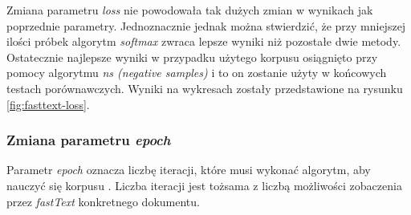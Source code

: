 Zmiana parametru \textit{loss} nie powodowała tak dużych zmian w wynikach jak poprzednie parametry. Jednoznacznie jednak można stwierdzić, że przy mniejszej ilości próbek algorytm \textit{softmax} zwraca lepsze wyniki niż pozostałe dwie metody. Ostatecznie najlepsze wyniki w przypadku użytego korpusu osiągnięto przy pomocy algorytmu \textit{ns (negative samples)} i to on zostanie użyty w końcowych testach porównawczych. Wyniki na wykresach zostały przedstawione na rysunku \ref{fig:fasttext-loss}.

\newpage
\subsubsection{Zmiana parametru \textit{epoch}}

Parametr \textit{epoch} oznacza liczbę iteracji, które musi wykonać algorytm, aby nauczyć się korpusu \cite{fasttext-github}. Liczba iteracji jest tożsama z liczbą możliwości zobaczenia przez \textit{fastText} konkretnego dokumentu. 

